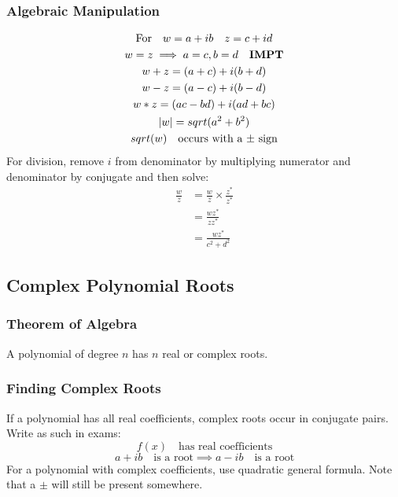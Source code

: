 \documentclass[../main]{subfiles}
\begin{document}
	\subsubsection{Algebraic Manipulation}  
	\begin{equation*} \begin{gathered}
		\text{For} \quad w = a+ib \quad z = c+id \\
		w = z \implies a = c, b = d \quad \text{\bf{IMPT}} \\
		w + z = (a+c) + i(b+d) \\
		w - z = (a-c) + i(b-d) \\
		w * z = (ac-bd) + i(ad+bc) \\
		|w| = sqrt(a^2+b^2) \\
		sqrt(w) \quad \text{occurs with a \(\pm\) sign}
	\end{gathered} \end{equation*}
	For division, remove \(i\) from denominator by multiplying numerator and denominator by conjugate and then solve:
	\begin{equation*} \begin{split}
		\frac{w}{z} & = \frac{w}{z} \times \frac{z^*}{z^*} \\
					& = \frac{wz^*}{zz^*} \\
					& = \frac{wz^*}{c^2+d^2}
	\end{split} \end{equation*}

\subsection{Complex Polynomial Roots}
	
	\subsubsection{Theorem of Algebra}
	A polynomial of degree \(n\) has \(n\) real or complex roots. \\
	\subsubsection{Finding Complex Roots}
	If a polynomial has all real coefficients, complex roots occur in conjugate pairs. Write as such in exams:
	\[ f(x) \quad \text{has real coefficients} \]
	\[ a+ib \quad \text{is a root} \implies a-ib \quad \text{is a root} \] 
	For a polynomial with complex coefficients, use quadratic general formula. Note that a \(\pm\) will still be present somewhere.
\end{document}
